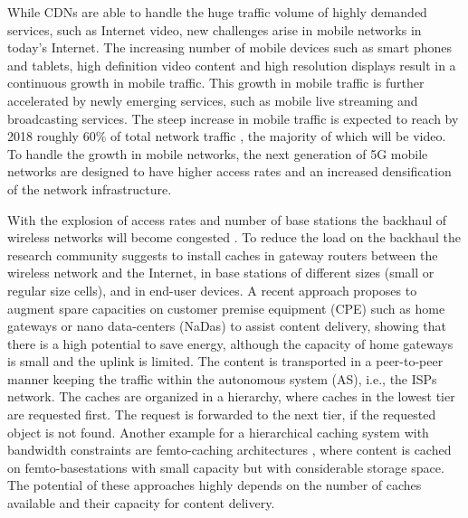 While CDNs are able to handle the huge traffic volume of highly demanded services, such as Internet video, new challenges arise in mobile networks in today's Internet.
The increasing number of mobile devices such as smart phones and tablets, high definition video content and high resolution displays result in a continuous growth in mobile traffic.
This growth in mobile traffic is further accelerated by newly emerging services, such as mobile live streaming and broadcasting services.
The steep increase in mobile traffic is expected to reach by 2018 roughly 60\% of total network traffic \cite{cisco2016}, the majority of which will be video.
To handle the growth in mobile networks, the next generation of 5G mobile networks are designed to have higher access rates and an increased densification of the network infrastructure.

With the explosion of access rates and number of base stations the backhaul of wireless networks will become congested \cite{paschos2016wireless}.
To reduce the load on the backhaul the research community suggests to install caches in gateway routers between the wireless network and the Internet, in base stations of different sizes (small or regular size cells), and in end-user devices.
A recent approach \cite{valancius2009greening} proposes to augment spare capacities on customer premise equipment (CPE) such as home gateways or nano data-centers (NaDas) to assist content delivery, showing that there is a high potential to save energy, although the capacity of home gateways is small and the uplink is limited.
The content is transported in a peer-to-peer manner keeping the traffic within the autonomous system (AS), i.e., the ISPs network.
The caches are organized in a hierarchy, where caches in the lowest tier are requested first. The request is forwarded to the next tier, if the requested object is not found.
Another example for a hierarchical caching system with bandwidth constraints are femto-caching architectures \cite{golrezaei2013femtocaching}, where content is cached on femto-basestations with small capacity but with considerable storage space.
The potential of these approaches highly depends on the number of caches available and their capacity for content delivery.

